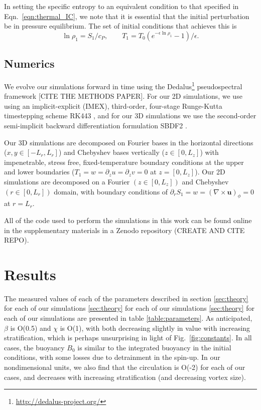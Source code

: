 \documentclass[twocolumn, amsmath, amsfonts, amssymb, trackchanges]{aastex62}
\newcommand{\grad}{\ensuremath{\nabla}}
\begin{document}
In setting the specific entropy to an equivalent condition to that specified in Eqn.~\ref{eqn:thermal_IC}, we note that it is essential that the initial perturbation be in pressure equilibrium. 
The set of initial conditions that achieves this is
\begin{equation}
\ln\rho_1 = S_1/c_P, \qquad T_1 = T_0(e^{-\epsilon\ln\rho_1} - 1)/\epsilon.
\end{equation}

\subsection{Numerics}
We evolve our simulations forward in time using the  Dedalus\footnote{\url{http://dedalus-project.org/}} pseudospectral framework \citep{burns&all2016} [CITE THE METHODS PAPER]. 
For our 2D simulations, we use using an implicit-explicit (IMEX), third-order, four-stage Runge-Kutta timestepping scheme RK443 \citep{ascher&all1997}, and for our 3D simulations we use the second-order semi-implicit backward differentiation formulation SBDF2 \citep{wang&ruuth2008}.

Our 3D simulations are decomposed on Fourier bases in the horizontal directions ($x, y \in [-L_r, L_r]$) and Chebyshev bases vertically ($z \in [0, L_z]$) with impenetrable, stress free, fixed-temperature boundary conditions at the upper and lower boundaries ($T_1 = w = \partial_z u = \partial_z v = 0$ at $z = [0, L_z]$).
Our 2D simulations are decomposed on a Fourier $(z \in [0, L_z])$ and Chebyshev $(r \in [0, L_r])$ domain, with boundary conditions of $\partial_r S_1 = w = (\grad\times\bm{u})_\phi = 0$ at $r = L_r$.

All of the code used to perform the simulations in this work can be found online in the supplementary materials in a Zenodo repository (CREATE AND CITE REPO).


\section{Results}
\label{sec:results}
The measured values of each of the parameters described in section \ref{sec:theory} for each of our simulations  \ref{sec:theory} for each of our simulations  \ref{sec:theory} for each of our simulations are presented in table \ref{table:parameters}.
As anticipated, $\beta$ is O(0.5) and $\chi$ is O(1), with both decreasing slightly in value with increasing stratification, which is perhaps unsurprising in light of Fig.~\ref{fig:constants}.
In all cases, the buoyancy $B_0$ is similar to the integrated buoyancy in the initial conditions, with some losses due to detrainment in the spin-up.
In our nondimensional units, we also find that the circulation is O(-2) for each of our cases, and decreases with increasing stratification (and decreasing vortex size).
\end{document}
